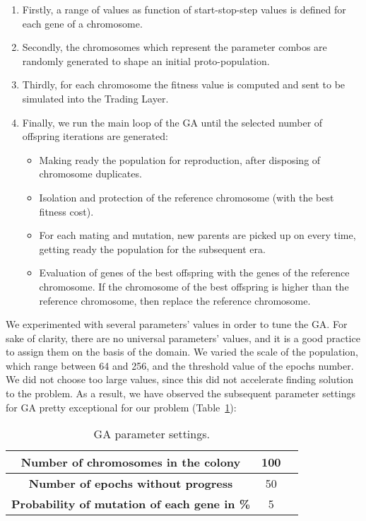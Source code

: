 \begin{enumerate}
\setlength\itemsep{0.3em}
\item Firstly, a range of values as function of start-stop-step values is defined for each gene of a chromosome.
\item Secondly, the chromosomes which represent the parameter combos are randomly generated to shape an initial proto-population.
\item Thirdly, for each chromosome the fitness value is computed and sent to be simulated into the Trading Layer.
\item Finally, we run the main loop of the GA until the selected number of offspring iterations are generated:
\begin{itemize}	
	\item Making ready the population for reproduction, after disposing of chromosome duplicates.
	\item Isolation and protection of the reference chromosome (with the best fitness cost).
	\item For each mating and mutation, new parents are picked up on every time, getting ready the population for the subsequent era.
	\item Evaluation of genes of the best offspring with the genes of the reference chromosome. If the chromosome of the best offspring is higher than the reference chromosome, then replace the reference chromosome.
\end{itemize}
\end{enumerate}

We experimented with several parameters' values in order to tune the GA. For sake of clarity, there are no universal parameters' values, and it is a good practice to assign them on the basis of the domain. We varied the scale of the population, which range between 64 and 256, and the threshold value of the epochs number. We did not choose too large values, since this did not accelerate finding solution to the problem. 
As a result, we have observed the subsequent parameter settings for GA pretty exceptional for our problem (Table~\ref{tab:GAPS}):

\begin{table}[htb]
\centering
\begin{tabular}{|c|c|c|}
\hline 
\textbf{Number of chromosomes in the colony} & 100 \\ 
\hline 
\textbf{Number of epochs without progress} &  50\\ 
\hline 
\textbf{Probability of mutation of each gene in \%} &  5\\  
\hline 
\end{tabular} 
\caption{\label{tab:GAPS}GA parameter settings.}
\end{table}


